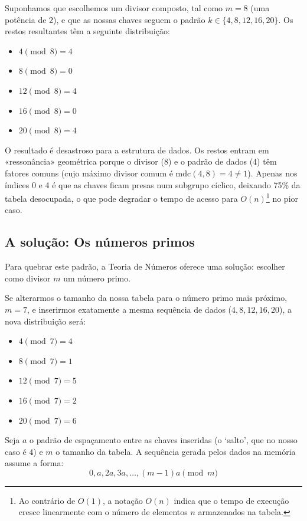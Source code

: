\documentclass[12pt, a4paper]{article}
\begin{document}
Suponhamos que escolhemos um divisor composto, tal como $m = 8$ (uma potência de 2), 
e que as nossas chaves seguem o padrão $k \in \{4, 8, 12, 16, 20\}$. Os restos resultantes 
têm a seguinte distribuição:

\begin{itemize}
    \item $4 \pmod{8} = 4$
    \item $8 \pmod{8} = 0$
    \item $12 \pmod{8} = 4$
    \item $16 \pmod{8} = 0$
    \item $20 \pmod{8} = 4$
\end{itemize}

O resultado é desastroso para a estrutura de dados. Os restos entram em «ressonância» 
geométrica porque o divisor (8) e o padrão de dados (4) têm fatores comuns (cujo máximo divisor comum é $\text{mdc}(4, 8) = 4 \neq 1$). 
Apenas nos índices 0 e 4 é que as chaves ficam presas num subgrupo cíclico, deixando 75\% da tabela desocupada, o que pode degradar o 
tempo de acesso para  $O(n)$\footnote{Ao contrário de $O(1)$, a notação $O(n)$ indica que o 
tempo de execução cresce linearmente com o número de elementos $n$ armazenados na tabela.} no pior caso.

\subsection{A solução: Os números primos}
Para quebrar este padrão, a Teoria de Números oferece uma solução: escolher como divisor $m$ um número primo.

Se alterarmos o tamanho da nossa tabela para o número primo mais próximo, $m = 7$, e 
inserirmos exatamente a mesma sequência de dados ($4, 8, 12, 16, 20$), a nova distribuição 
será:
\begin{itemize}
    \item $4 \pmod{7} = 4$
    \item $8 \pmod{7} = 1$
    \item $12 \pmod{7} = 5$
    \item $16 \pmod{7} = 2$
    \item $20 \pmod{7} = 6$
\end{itemize}

Seja $a$ o padrão de espaçamento entre as chaves inseridas (o `salto', que no nosso caso é $4$) e $m$ o tamanho da tabela. A sequência gerada pelos dados na memória assume a forma:
\begin{equation}
    0, a, 2a, 3a, \dots, (m-1)a \pmod{m}
\end{equation}
\end{document}
